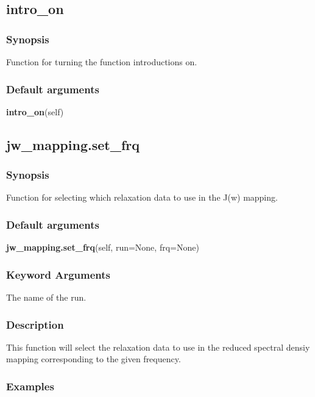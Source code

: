 \subsection{intro\_on}


\subsubsection{Synopsis}

Function for turning the function introductions on.

\subsubsection{Default arguments}

\textsf{\textbf{intro\_on}(self)}



\newpage

\subsection{jw\_mapping.set\_frq}


\subsubsection{Synopsis}

Function for selecting which relaxation data to use in the J(w) mapping.

\subsubsection{Default arguments}

\textsf{\textbf{jw\_mapping.set\_frq}(self, run=None, frq=None)}


\subsubsection{Keyword Arguments}

  The name of the run.


\subsubsection{Description}

This function will select the relaxation data to use in the reduced spectral densiy mapping
corresponding to the given frequency.


\subsubsection{Examples}

